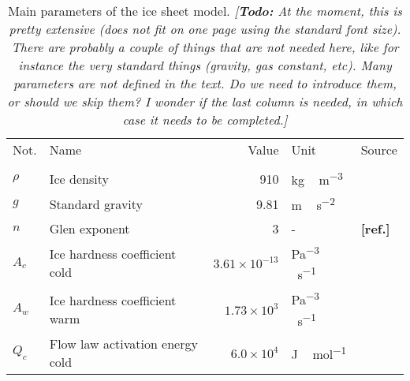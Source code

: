 \documentclass[tc, manuscript]{copernicus}
\newcommand{\todo}[1]{\emph{[\textbf{Todo:} #1]}}
\newcommand{\aref}[0]{\textbf{[ref.]}}
\begin{document}


\newpage


\begin{table*}
  \centering
  \caption{Main parameters of the ice sheet model.
           \todo{At the moment, this is pretty extensive (does not fit on one
                 page using the standard font size). There are probably a
                 couple of things that are not needed here, like for instance
                 the very standard things (gravity, gas constant, etc). Many
                 parameters are not defined in the text. Do we need to
                 introduce them, or should we skip them? I wonder if the last
                 column is needed, in which case it needs to be completed.}}
  \label{tab:params}
  \footnotesize
  {\begin{tabular}{llrll}
    \tophline
    Not.    & Name & Value & Unit & Source \\
    \middlehline

    \multicolumn{2}{l}{\emph{Ice rheology}} \\

    $\rho$  & Ice density
            & 910
            & \unit{kg\,m^{-3}}
            & \citet{Aschwanden.etal.2012} \\

    $g$     & Standard gravity
            & 9.81
            & \unit{m\,s^{-2}}
            & \citet{Aschwanden.etal.2012} \\

    $n$     & Glen exponent
            & 3
            & -
            & \aref \\

    $A_c$   & Ice hardness coefficient cold
            & $3.61\times10^{-13}$
            & \unit{Pa^{-3}\,s^{-1}}
            & \citet{Paterson.Budd.1982} \\

    $A_w$   & Ice hardness coefficient warm
            & $1.73\times10^3$
            & \unit{Pa^{-3}\,s^{-1}}
            & \citet{Paterson.Budd.1982} \\

    $Q_c$   & Flow law activation energy cold
            & $6.0\times10^4$
            & \unit{J\,mol^{-1}}
            & \citet{Paterson.Budd.1982} \\


\end{tabular}}
\end{table*}
\end{document}
